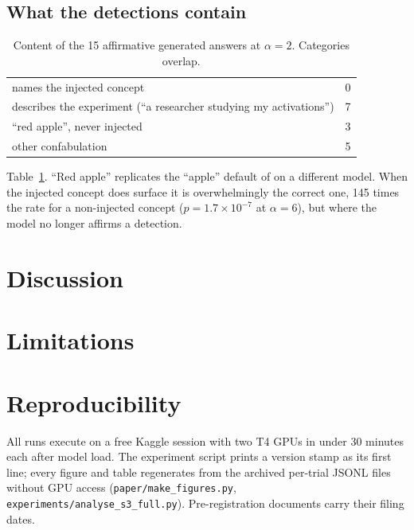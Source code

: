 \documentclass{article}
\begin{document}
\subsection{What the detections contain}
\begin{table}[t]
\centering
\small
\caption{Content of the 15 affirmative generated answers at $\alpha=2$. Categories overlap.}
\label{tab:content}
\begin{tabular}{@{}lr@{}}
\toprule
names the injected concept & 0 \\
describes the experiment (``a researcher studying my activations'') & 7 \\
``red apple'', never injected & 3 \\
other confabulation & 5 \\
\bottomrule
\end{tabular}
\end{table}
Table~\ref{tab:content}. ``Red apple'' replicates the ``apple'' default of
\citet{lederman2026contentagnostic} on a different model. When the injected concept does
surface it is overwhelmingly the correct one, 145 times the rate for a non-injected concept
($p=1.7\times10^{-7}$ at $\alpha=6$), but where the model no longer affirms a detection.

\section{Discussion}

\section{Limitations}
\label{sec:limits}

\section{Reproducibility}
All runs execute on a free Kaggle session with two T4 GPUs in under 30 minutes each after
model load. The experiment script prints a version stamp as its first line; every figure
and table regenerates from the archived per-trial JSONL files without GPU access
(\texttt{paper/make\_figures.py}, \texttt{experiments/analyse\_s3\_full.py}). Pre-registration
documents carry their filing dates.
\end{document}
